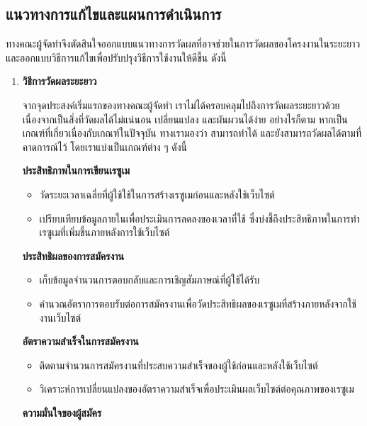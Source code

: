 \subsection{แนวทางการแก้ไขและแผนการดำเนินการ}
ทางคณะผู้จัดทำจึงตัดสินใจออกแบบแนวทางการวัดผลที่อาจช่วยในการวัดผลของโครงงานในระยะยาว และออกแบบวิธีการแก้ไขเพื่อปรับปรุงวิธีการใช้งานให้ดีขึ้น ดังนี้

\begin{enumerate}
    \item \textbf{วิธีการวัดผลระยะยาว}
    
    \par{
        จากจุดประสงค์เริ่มแรกของทางคณะผู้จัดทำ เราไม่ได้ครอบคลุมไปถึงการวัดผลระยะยาวด้วย เนื่องจากเป็นสิ่งที่วัดผลได้ไม่แน่นอน เปลี่ยนแปลง และผันผวนได้ง่าย อย่างไรก็ตาม หากเป็นเกณฑ์ที่เกี่ยวเนื่องกับเกณฑ์ในปัจจุบัน ทางเรามองว่า สามารถทำได้ และยังสามารถวัดผลได้ตามที่คาดการณ์ไว้ โดยเราแบ่งเป็นเกณฑ์ต่าง ๆ ดังนี้
    }


    \textbf{ประสิทธิภาพในการเขียนเรซูเม}


    \begin{itemize}
        \item วัดระยะเวลาเฉลี่ยที่ผู้ใช้ใช้ในการสร้างเรซูเมก่อนและหลังใช้เว็บไซต์
        \item เปรียบเทียบข้อมูลภายในเพื่อประเมินการลดลงของเวลาที่ใช้ ซึ่งบ่งชี้ถึงประสิทธิภาพในการทำเรซูเมที่เพิ่มขึ้นภายหลังการใช้เว็บไซต์
    \end{itemize}

    \textbf{ประสิทธิผลของการสมัครงาน}


    \begin{itemize}
        \item เก็บข้อมูลจำนวนการตอบกลับและการเชิญสัมภาษณ์ที่ผู้ใช้ได้รับ
        \item คำนวณอัตราการตอบรับต่อการสมัครงานเพื่อวัดประสิทธิผลของเรซูเมที่สร้างภายหลังจากใช้งานเว็บไซต์
    \end{itemize}

    \textbf{อัตราความสำเร็จในการสมัครงาน}


    \begin{itemize}
        \item ติดตามจำนวนการสมัครงานที่ประสบความสำเร็จของผู้ใช้ก่อนและหลังใช้เว็บไซต์
        \item วิเคราะห์การเปลี่ยนแปลงของอัตราความสำเร็จเพื่อประเมินผลเว็บไซต์ต่อคุณภาพของเรซูเม
    \end{itemize}

    \textbf{ความมั่นใจของผู้สมัคร}



\end{enumerate}
